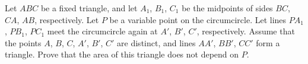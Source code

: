 Let $ ABC$ be a fixed triangle, and let $ A_1$,  $ B_1$,  $ C_1$ be the midpoints of sides $ BC$,  $ CA$,  $ AB$,  respectively. Let $ P$ be a variable point on the circumcircle. Let lines $ PA_1$,  $ PB_1$,  $ PC_1$ meet the circumcircle again at $ A'$,  $ B'$,  $ C'$,  respectively. Assume that the points $ A$,  $ B$,  $ C$,  $ A'$,  $ B'$,  $ C'$ are distinct, and lines $ AA'$,  $ BB'$,  $ CC'$ form a triangle. Prove that the area of this triangle does not depend on $ P$.